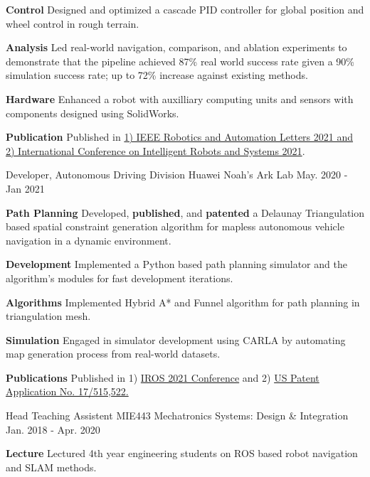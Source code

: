 \begin{cventries}
{\begin{cvitems}
{			}
			\item {
				\textbf{Control} Designed and optimized a cascade PID controller for global position and wheel control in rough terrain.
			}
			\item {
				\textbf{Analysis} Led real-world navigation, comparison, and ablation experiments to demonstrate that the pipeline achieved 87\% real world success rate given a 90\% simulation success rate; up to 72\% increase against existing methods.
			}
			\item {
				\textbf{Hardware} Enhanced a robot with auxilliary computing units and sensors with components designed using SolidWorks.
			}
			\item {
				\textbf{Publication} Published in \href{https://ieeexplore.ieee.org/document/9468918}{1) IEEE Robotics and Automation Letters 2021 and 2) International Conference on Intelligent Robots and Systems 2021}.
			}
		\end{cvitems}
	}
	\cventry
	{Developer, Autonomous Driving Division}
	{Huawei Noah’s Ark Lab}
	{May. 2020 - Jan 2021}
	{}
	{
		\begin{cvitems}
			\item {
				\textbf{Path Planning} Developed, \textbf{published}, and \textbf{patented} a Delaunay Triangulation based spatial constraint generation algorithm for mapless autonomous vehicle navigation in a dynamic environment.
			}
			\item {
				\textbf{Development} Implemented a Python based path planning simulator and the algorithm's modules for fast development iterations.
			}
			\item {
				\textbf{Algorithms} Implemented Hybrid A* and Funnel algorithm for path planning in triangulation mesh.
			}
			\item {
				\textbf{Simulation} Engaged in simulator development using CARLA by automating map generation process from real-world datasets.
			}
			\item{
				\textbf{Publications} Published in 1) \href{https://ieeexplore.ieee.org/document/9636067}{IROS 2021 Conference} and 2) \href{https://patents.google.com/patent/US20220135068A1/en}{US Patent Application No. 17/515,522.}
			}
		\end{cvitems}
	}
	\cventry
	{Head Teaching Assistent}
	{MIE443 Mechatronics Systems: Design \& Integration}
	{Jan. 2018 - Apr. 2020}
	{}
	{
		\begin{cvitems}
			\item {
				\textbf{Lecture} Lectured 4th year engineering students on ROS based robot navigation and SLAM methods.
}
\end{cvitems}}
\end{cventries}
